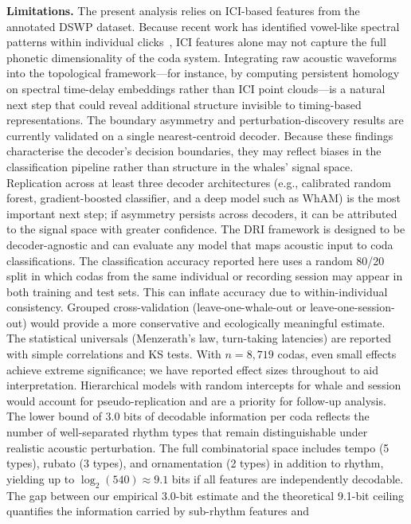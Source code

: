 \documentclass[11pt,a4paper]{article}
\begin{document}
\noindent\textbf{Limitations.}
The present analysis relies on ICI-based features from the annotated
DSWP dataset. Because recent work has identified vowel-like spectral
patterns within individual clicks~\citep{Begus2025}, ICI features alone
may not capture the full phonetic dimensionality of the coda system.
Integrating raw acoustic waveforms into the topological framework---for
instance, by computing persistent homology on spectral time-delay
embeddings rather than ICI point clouds---is a natural next step that
could reveal additional structure invisible to timing-based
representations.
%
The boundary asymmetry and perturbation-discovery results are currently
validated on a single nearest-centroid decoder. Because these findings
characterise the decoder's decision boundaries, they may reflect biases
in the classification pipeline rather than structure in the whales'
signal space. Replication across at least three decoder architectures
(e.g., calibrated random forest, gradient-boosted classifier, and a
deep model such as WhAM) is the most important next step; if asymmetry
persists across decoders, it can be attributed to the signal space with
greater confidence. The DRI framework is designed to be decoder-agnostic
and can evaluate any model that maps acoustic input to coda
classifications.
%
The classification accuracy reported here uses a random 80/20 split in
which codas from the same individual or recording session may appear in
both training and test sets. This can inflate accuracy due to
within-individual consistency. Grouped cross-validation
(leave-one-whale-out or leave-one-session-out) would provide a more
conservative and ecologically meaningful estimate.
%
The statistical universals (Menzerath's law, turn-taking latencies) are
reported with simple correlations and KS tests. With $n = 8{,}719$
codas, even small effects achieve extreme significance; we have reported
effect sizes throughout to aid interpretation. Hierarchical models with
random intercepts for whale and session would account for
pseudo-replication and are a priority for follow-up analysis.
%
The lower bound of 3.0 bits of decodable information per coda reflects
the number of well-separated rhythm types that remain distinguishable
under realistic acoustic perturbation. The full combinatorial space
includes tempo (5 types), rubato (3 types), and ornamentation (2
types) in addition to rhythm, yielding up to $\log_2(540) \approx 9.1$
bits if all features are independently decodable. The gap between our
empirical 3.0-bit estimate and the theoretical 9.1-bit ceiling
quantifies the information carried by sub-rhythm features and
\end{document}
